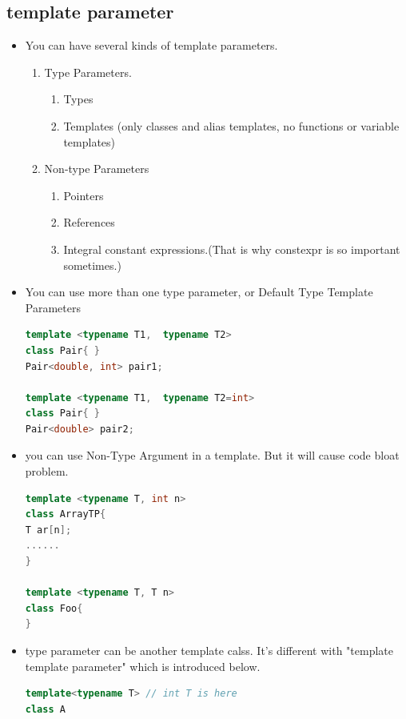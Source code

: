 \documentclass[a4paper,12pt,twoside]{book}
\begin{document}
\subsection{template parameter}

\begin{itemize}
\item You can have several kinds of template parameters.
\begin{enumerate}
\item  Type Parameters.
  	\begin{enumerate}
   	\item Types
    \item  Templates (only classes and alias templates, no functions or variable templates)
	\end{enumerate}

\item Non-type Parameters
   \begin{enumerate}
	\item Pointers
	\item References
	\item Integral constant expressions.(That is why constexpr is so important sometimes.)
	\end{enumerate}
\end{enumerate}

\item You can use more than one type parameter, or Default Type Template Parameters
\begin{lstlisting}[frame=single, language=c++]
template <typename T1,  typename T2>
class Pair{ }
Pair<double, int> pair1;

template <typename T1,  typename T2=int>
class Pair{ }
Pair<double> pair2;
\end{lstlisting}

\item you can use Non-Type Argument in a template. But it will cause code bloat problem. 
\begin{lstlisting}[frame=single, language=c++]
template <typename T, int n>
class ArrayTP{
T ar[n];
......
}

template <typename T, T n>
class Foo{
}
\end{lstlisting}

\item type parameter can be another template calss.  It's different with "template template parameter" which is introduced below.
\begin{lstlisting}[frame=single, language=c++]
template<typename T> // int T is here
class A


\end{lstlisting}
\end{itemize}
\end{document}
